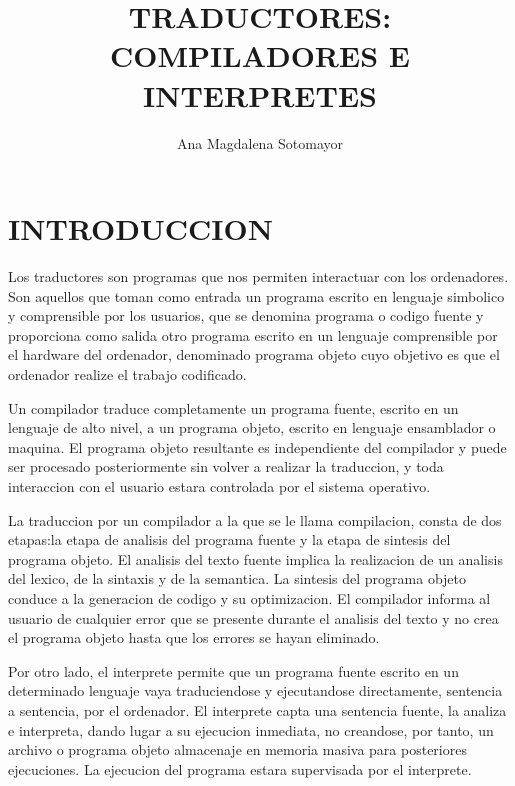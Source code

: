 \documentclass[11pt]{article}
\begin{document}
 
\title{TRADUCTORES: COMPILADORES E INTERPRETES} 
\author{Ana Magdalena Sotomayor} 

\maketitle 
\section{INTRODUCCION}
Los traductores son programas que nos permiten interactuar con los ordenadores. Son aquellos que  toman como entrada un programa escrito en lenguaje simbolico y comprensible por los usuarios, que se denomina programa o codigo fuente y proporciona como salida otro programa escrito en un lenguaje comprensible por el hardware del ordenador, denominado programa objeto cuyo objetivo es que el ordenador realize el trabajo codificado.

Un compilador traduce completamente un programa fuente, escrito en un lenguaje de alto nivel, a un programa objeto, escrito en lenguaje ensamblador o maquina. El programa objeto resultante es independiente del compilador y puede ser procesado posteriormente sin volver a realizar la traduccion, y toda interaccion con el usuario estara controlada por el sistema operativo. 

La traduccion por un compilador a la que se le llama compilacion, consta de dos etapas:la etapa de analisis del programa fuente y la etapa de sintesis del programa objeto. El analisis del texto fuente implica la realizacion de un analisis del lexico, de la sintaxis y de la semantica. La sintesis del programa objeto conduce a la generacion de codigo y su optimizacion. El compilador informa al usuario de cualquier error que se presente durante el analisis del texto y no crea el programa objeto hasta que los errores se hayan eliminado.

Por otro lado, el interprete permite que un programa fuente escrito en un determinado lenguaje vaya traduciendose y ejecutandose directamente, sentencia a sentencia, por el ordenador. El interprete capta una sentencia fuente, la analiza e interpreta, dando lugar a su ejecucion inmediata, no creandose, por tanto, un archivo o programa objeto almacenaje en memoria masiva para posteriores ejecuciones. La ejecucion del programa estara supervisada por el interprete.
\end{document}
